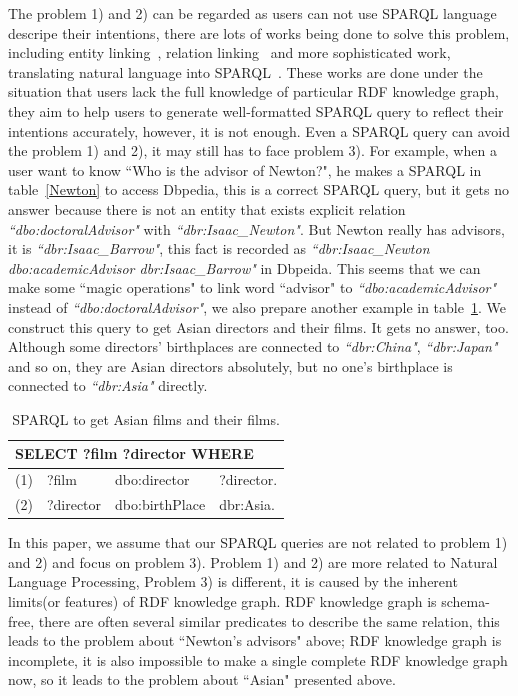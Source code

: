 \documentclass[runningheads]{llncs}
\begin{document}
The problem 1) and 2) can be regarded as users can not use SPARQL language descripe their intentions, there are lots of works being done to solve this problem, including entity linking~\cite{el_Han}, relation linking~\cite{dubey2018earl} and more sophisticated work, translating natural language into SPARQL~\cite{sander2014ontology}.
These works are done under the situation that users lack the full knowledge of particular RDF knowledge graph, they aim to help users to generate well-formatted SPARQL query to reflect their intentions accurately, however, it is not enough. Even a SPARQL query can avoid the problem 1) and 2), it may still has to face problem 3).
For example, when a user want to know ``Who is the advisor of Newton?", he makes a SPARQL in table~\ref{Newton} to access Dbpedia, this is a correct SPARQL query, but it gets no answer because there is not an entity that exists explicit relation \textit{``dbo:doctoralAdvisor"} with \textit{``dbr:Isaac\_Newton"}. But Newton really has advisors, it is \textit{``dbr:Isaac\_Barrow"}, this fact is recorded as \textit{``dbr:Isaac\_Newton dbo:academicAdvisor dbr:Isaac\_Barrow" } in Dbpeida.  This seems that we can make some ``magic operations" to link word ``advisor" to \textit{``dbo:academicAdvisor"} instead of \textit{``dbo:doctoralAdvisor"}, we also prepare another example in table~\ref{film_table}. We construct this query to get Asian directors and their films. It gets no answer, too. Although some directors' birthplaces are connected to \textit{``dbr:China"}, \textit{``dbr:Japan"} and so on, they are Asian directors absolutely, but no one's birthplace is connected to \textit{``dbr:Asia"} directly.

\begin{table}
\caption{SPARQL to get Asian films and their films.}\label{film_table}
\centering
\begin{tabular}{|c|lll|}
\hline
\multicolumn{4}{|l|}{SELECT ?film ?director WHERE }\\
\hline
(1) &  ?film & dbo:director & ?director.\\
(2) &  ?director & dbo:birthPlace & dbr:Asia.\\
\hline
\end{tabular}
\end{table}

In this paper, we assume that our SPARQL queries are not related to problem 1) and 2) and focus on problem 3).
Problem 1) and 2) are more related to Natural Language Processing, Problem 3) is different, it is caused by the inherent limits(or features) of RDF knowledge graph. RDF knowledge graph is schema-free, there are often several similar predicates to describe the same relation, this leads to the problem about ``Newton's advisors" above; RDF knowledge graph is incomplete, it is also impossible to make a single complete RDF knowledge graph now, so it leads to the problem about ``Asian" presented above.
\end{document}
